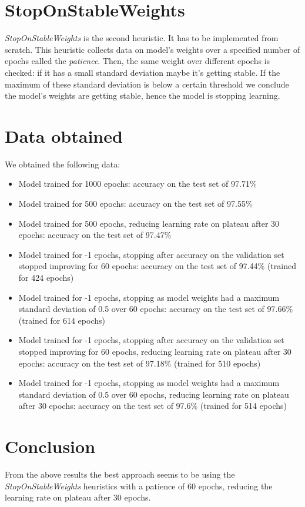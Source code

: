 \section{StopOnStableWeights}
\emph{StopOnStableWeights} is the second heuristic. It has to be
implemented from scratch. This heuristic collects data on model's
weights over a specified number of epochs called the \emph{patience}.
Then, the same weight over different epochs is checked: if it has a
small standard deviation maybe it's getting stable. If the maximum of
these standard deviation is below a certain threshold we conclude the
model's weights are getting stable, hence the model is stopping
learning.

\section{Data obtained}
We obtained the following data:
\begin{itemize}
\item
  Model trained for 1000 epochs: accuracy on the test set of 97.71\%
\item
  Model trained for 500 epochs: accuracy on the test set of 97.55\%
\item
  Model trained for 500 epochs, reducing learning rate on plateau after
  30 epochs: accuracy on the test set of 97.47\%
\item
  Model trained for -1 epochs, stopping after accuracy on the
  validation set stopped improving for 60 epochs: accuracy on the test
  set of 97.44\% (trained for 424 epochs)
\item
  Model trained for -1 epochs, stopping as model weights had a maximum
  standard deviation of 0.5 over 60 epochs: accuracy on the test set of
  97.66\% (trained for 614 epochs)
\item
  Model trained for -1 epochs, stopping after accuracy on the
  validation set stopped improving for 60 epochs, reducing learning
  rate on plateau after 30 epochs: accuracy on the test
  set of 97.18\% (trained for 510 epochs)
\item
  Model trained for -1 epochs, stopping as model weights had a maximum
  standard deviation of 0.5 over 60 epochs, reducing learning
  rate on plateau after 30 epochs: accuracy on the test set of
  97.6\% (trained for 514 epochs)
\end{itemize}

\section{Conclusion}
From the above results the best approach seems to be using the
\emph{StopOnStableWeights} heuristics with a patience of 60 epochs,
reducing the learning rate on plateau after 30 epochs.

